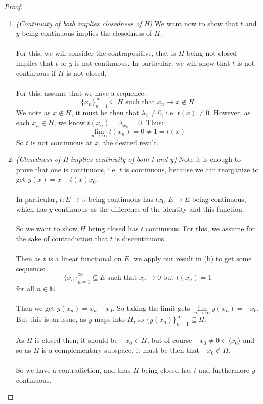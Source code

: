 \documentclass[12pt]{article}
\newenvironment{ex}[2][Exercise]{\begin{trivlist}
\item[\hskip \labelsep {\bfseries #1}\hskip \labelsep {\bfseries #2.}]}{\end{trivlist}}
\begin{document}
\begin{ex}{2}
\begin{enumerate}[label=(\alph*)]
\begin{proof}
\begin{enumerate}[label=(\arabic*)]
            \item \textit{(Continuity of both implies closedness of H)}
            We want now to show that $t$ and $y$ being continuous implies the closedness of $H$. \\ \\ 
            For this, we will consider the contrapositive, that is $H$ being not closed implies that $t$ or $y$ is not continuous. In particular, we will show that $t$ is not continuous if $H$ is not closed. \\ \\
            For this, assume that we have a sequence: $$\{x_n\}_{n = 1}^\infty \subseteq H \text{ such that } x_n \rightarrow x \notin H$$ We note as $x \notin H$, it must be then that $\lambda_x \neq 0$, i.e. $t(x) \neq 0$. However, as each $x_n \in H$, we know $t(x_n) = \lambda_{x_n} = 0$. Thus: 
            $$\underset{n \rightarrow \infty}{\lim} t(x_n) = 0 \neq 1 = t(x)$$
            So $t$ is not continuous at $x$, the desired result.
            \item \textit{(Closedness of H implies continuity of both t and y)}
            Note it is enough to prove that one is continuous, i.e. $t$ is continuous, because we can reorganize to get $y(x) = x - t(x)x_0$. \\ \\ In particular, $t : E \rightarrow \mathbb{R}$ being continuous has $tx_0 : E \rightarrow E$ being continuous, which has $y$ continuous as the difference of the identity and this function. \\ \\
            So we want to show $H$ being closed has $t$ continuous. For this, we assume for the sake of contradiction that $t$ is discontinuous. \\ \\Then as $t$ is a linear functional on $E$, we apply our result in (b) to get some sequence: $$\{x_n\}_{n = 1}^\infty \subseteq E \text{ such that } x_n \rightarrow 0 \text{ but }t(x_n) = 1$$ for all $n \in \mathbb{N}$. \\ \\
            Then we get $y(x_n) = x_n - x_0$. So taking the limit gets $\underset{n \rightarrow \infty}{\lim} y(x_n) = -x_0$. But this is an issue, as $y$ maps into $H$, so $\{y(x_n)\}_{n = 1}^\infty \subseteq H$. \\ \\  As $H$ is closed then, it should be $-x_0 \in H$, but of course $-x_0 \neq 0 \in \langle x_0 \rangle$ and so as $H$ is a complementary subspace, it must be then that $-x_0 \notin H$. \\ \\ So we have a contradiction, and thus $H$ being closed has $t$ and furthermore $y$ continuous.

\end{enumerate}
\end{proof}
\end{enumerate}
\end{ex}
\end{document}
